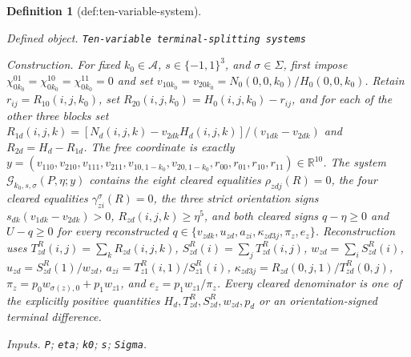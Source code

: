 \documentclass{article}
\newtheorem{definition}{Definition}
\begin{document}
\begin{definition}[def:ten-variable-system]\label{def:ten-variable-system}
\par\smallskip\noindent\emph{Defined object.} \texttt{Ten-\allowbreak{}variable terminal-\allowbreak{}splitting systems}
\par\smallskip\noindent\emph{Construction.} For fixed \(k_0\in\mathcal A\), \(s\in\{-1,1\}^{3}\), and \(\sigma\in\Sigma\), first impose \(\chi_{0k_0}^{01}=\chi_{0k_0}^{10}=\chi_{0k_0}^{11}=0\) and set \(v_{10k_0}=v_{20k_0}=N_0(0,0,k_0)/H_0(0,0,k_0)\). Retain \(r_{ij}=R_{10}(i,j,k_0)\), set \(R_{20}(i,j,k_0)=H_0(i,j,k_0)-r_{ij}\), and for each of the other three blocks set \(R_{1d}(i,j,k)=[N_d(i,j,k)-v_{2dk}H_d(i,j,k)]/(v_{1dk}-v_{2dk})\) and \(R_{2d}=H_d-R_{1d}\). The free coordinate is exactly \(y=(v_{110},v_{210},v_{111},v_{211},v_{10,1-k_0},v_{20,1-k_0},r_{00},r_{01},r_{10},r_{11})\in\mathbb R^{10}\). The system \(\mathscr G_{k_0,s,\sigma}(P,\eta;y)\) contains the eight cleared equalities \(\rho_{zdj}(R)=0\), the four cleared equalities \(\gamma_{zi}^{\sigma}(R)=0\), the three strict orientation signs \(s_{dk}(v_{1dk}-v_{2dk})>0\), \(R_{zd}(i,j,k)\ge\eta^5\), and both cleared signs \(q-\eta\ge0\) and \(U-q\ge0\) for every reconstructed \(q\in\{v_{zdk},u_{zd},a_{zi},\kappa_{zd3j},\pi_z,e_z\}\). Reconstruction uses \(T_{zd}^{R}(i,j)=\sum_kR_{zd}(i,j,k)\), \(S_{zd}^{R}(i)=\sum_jT_{zd}^{R}(i,j)\), \(w_{zd}=\sum_iS_{zd}^{R}(i)\), \(u_{zd}=S_{zd}^{R}(1)/w_{zd}\), \(a_{zi}=T_{z1}^{R}(i,1)/S_{z1}^{R}(i)\), \(\kappa_{zd3j}=R_{zd}(0,j,1)/T_{zd}^{R}(0,j)\), \(\pi_z=p_0w_{\sigma(z),0}+p_1w_{z1}\), and \(e_z=p_1w_{z1}/\pi_z\). Every cleared denominator is one of the explicitly positive quantities \(H_d,T_{zd}^{R},S_{zd}^{R},w_{zd},p_d\) or an orientation-signed terminal difference.
\par\smallskip\noindent\emph{Inputs.} \texttt{P}; \texttt{eta}; \texttt{k0}; \texttt{s}; \texttt{Sigma}.
\end{definition}
\end{document}
